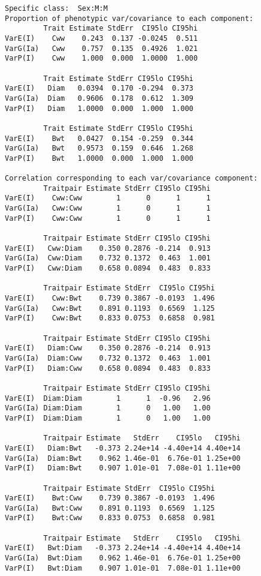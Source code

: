 \documentclass[titlepage]{article}  %
\begin{document}
\begin{verbatim}
Specific class:  Sex:M:M 
Proportion of phenotypic var/covariance to each component:
         Trait Estimate StdErr  CI95lo CI95hi
VarE(I)    Cww    0.243  0.137 -0.0245  0.511
VarG(Ia)   Cww    0.757  0.135  0.4926  1.021
VarP(I)    Cww    1.000  0.000  1.0000  1.000

         Trait Estimate StdErr CI95lo CI95hi
VarE(I)   Diam   0.0394  0.170 -0.294  0.373
VarG(Ia)  Diam   0.9606  0.178  0.612  1.309
VarP(I)   Diam   1.0000  0.000  1.000  1.000

         Trait Estimate StdErr CI95lo CI95hi
VarE(I)    Bwt   0.0427  0.154 -0.259  0.344
VarG(Ia)   Bwt   0.9573  0.159  0.646  1.268
VarP(I)    Bwt   1.0000  0.000  1.000  1.000

Correlation corresponding to each var/covariance component:
         Traitpair Estimate StdErr CI95lo CI95hi
VarE(I)    Cww:Cww        1      0      1      1
VarG(Ia)   Cww:Cww        1      0      1      1
VarP(I)    Cww:Cww        1      0      1      1

         Traitpair Estimate StdErr CI95lo CI95hi
VarE(I)   Cww:Diam    0.350 0.2876 -0.214  0.913
VarG(Ia)  Cww:Diam    0.732 0.1372  0.463  1.001
VarP(I)   Cww:Diam    0.658 0.0894  0.483  0.833

         Traitpair Estimate StdErr  CI95lo CI95hi
VarE(I)    Cww:Bwt    0.739 0.3867 -0.0193  1.496
VarG(Ia)   Cww:Bwt    0.891 0.1193  0.6569  1.125
VarP(I)    Cww:Bwt    0.833 0.0753  0.6858  0.981

         Traitpair Estimate StdErr CI95lo CI95hi
VarE(I)   Diam:Cww    0.350 0.2876 -0.214  0.913
VarG(Ia)  Diam:Cww    0.732 0.1372  0.463  1.001
VarP(I)   Diam:Cww    0.658 0.0894  0.483  0.833

         Traitpair Estimate StdErr CI95lo CI95hi
VarE(I)  Diam:Diam        1      1  -0.96   2.96
VarG(Ia) Diam:Diam        1      0   1.00   1.00
VarP(I)  Diam:Diam        1      0   1.00   1.00

         Traitpair Estimate   StdErr    CI95lo   CI95hi
VarE(I)   Diam:Bwt   -0.373 2.24e+14 -4.40e+14 4.40e+14
VarG(Ia)  Diam:Bwt    0.962 1.46e-01  6.76e-01 1.25e+00
VarP(I)   Diam:Bwt    0.907 1.01e-01  7.08e-01 1.11e+00

         Traitpair Estimate StdErr  CI95lo CI95hi
VarE(I)    Bwt:Cww    0.739 0.3867 -0.0193  1.496
VarG(Ia)   Bwt:Cww    0.891 0.1193  0.6569  1.125
VarP(I)    Bwt:Cww    0.833 0.0753  0.6858  0.981

         Traitpair Estimate   StdErr    CI95lo   CI95hi
VarE(I)   Bwt:Diam   -0.373 2.24e+14 -4.40e+14 4.40e+14
VarG(Ia)  Bwt:Diam    0.962 1.46e-01  6.76e-01 1.25e+00
VarP(I)   Bwt:Diam    0.907 1.01e-01  7.08e-01 1.11e+00


\end{verbatim}
\end{document}
